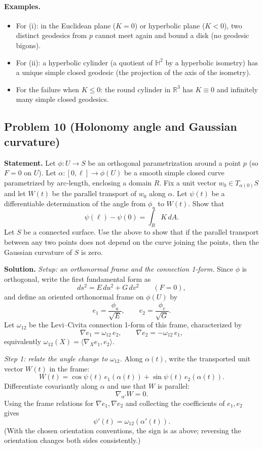 \documentclass[12pt,a4paper]{article}
\theoremstyle{plain}
\theoremstyle{definition}      %
\begin{document}
	\paragraph{Examples.}
	\begin{itemize}
		\item For (i): in the Euclidean plane ($K=0$) or hyperbolic plane ($K<0$), two distinct geodesics from $p$
		cannot meet again and bound a disk (no geodesic bigons).
		\item For (ii): a hyperbolic cylinder (a quotient of $\mathbb{H}^2$ by a hyperbolic isometry) has a unique simple closed geodesic
		(the projection of the axis of the isometry).
		\item For the failure when $K\le 0$: the round cylinder in $\mathbb{R}^3$ has $K\equiv 0$ and infinitely many simple closed geodesics.
	\end{itemize}
	
	\subsection*{Problem 10 (Holonomy angle and Gaussian curvature)}
	
	\textbf{Statement.}
	Let $\phi:U\to S$ be an orthogonal parametrization around a point $p$ (so $F=0$ on $U$).
	Let $\alpha:[0,\ell]\to \phi(U)$ be a smooth simple closed curve parametrized by arc-length, enclosing a domain $R$.
	Fix a unit vector $w_0\in T_{\alpha(0)}S$ and let $W(t)$ be the parallel transport of $w_0$ along $\alpha$.
	Let $\psi(t)$ be a differentiable determination of the angle from $\phi_u$ to $W(t)$.
	Show that
	\[
	\psi(\ell)-\psi(0)=\int_R K\,dA.
	\]
	Let $S$ be a connected surface. Use the above to show that if the parallel transport between any two points does not
	depend on the curve joining the points, then the Gaussian curvature of $S$ is zero.
	
	\textbf{Solution.}
	\textit{Setup: an orthonormal frame and the connection 1-form.}
	Since $\phi$ is orthogonal, write the first fundamental form as
	\[
	ds^2 = E\,du^2 + G\,dv^2 \qquad (F=0),
	\]
	and define an oriented orthonormal frame on $\phi(U)$ by
	\[
	e_1=\frac{\phi_u}{\sqrt{E}},\qquad e_2=\frac{\phi_v}{\sqrt{G}}.
	\]
	Let $\omega_{12}$ be the Levi--Civita connection 1-form of this frame, characterized by
	\[
	\nabla e_1 = \omega_{12}\, e_2,\qquad \nabla e_2 = -\omega_{12}\, e_1,
	\]
	equivalently $\omega_{12}(X)=\langle \nabla_X e_1, e_2\rangle$.
	
	\textit{Step 1: relate the angle change to $\omega_{12}$.}
	Along $\alpha(t)$, write the transported unit vector $W(t)$ in the frame:
	\[
	W(t)=\cos\psi(t)\,e_1(\alpha(t))+\sin\psi(t)\,e_2(\alpha(t)).
	\]
	Differentiate covariantly along $\alpha$ and use that $W$ is parallel:
	\[
	\nabla_{\alpha'}W = 0.
	\]
	Using the frame relations for $\nabla e_1,\nabla e_2$ and collecting the coefficients of $e_1,e_2$ gives
	\[
	\psi'(t)=\omega_{12}(\alpha'(t)).
	\]
	(With the chosen orientation conventions, the sign is as above; reversing the orientation changes both sides consistently.)
	
\end{document}
